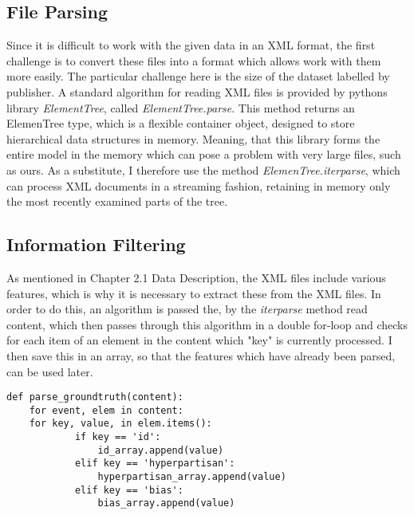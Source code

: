 \documentclass[a4paper, 11pt,titlepage,oneside,openany]{book}
\begin{document}
\newpage
\subsection{File Parsing}
Since it is difficult to work with the given data in an XML format, the first challenge is to convert these files into a format which allows work with them more easily. The particular challenge here is the size of the dataset labelled by publisher. A standard algorithm for reading XML files is provided by pythons library \textit{ElementTree}, called \textit{ElementTree.parse}\cite{parse}. This method returns an ElemenTree type, which is a flexible container object, designed to store hierarchical data structures in memory. Meaning, that this library forms the entire model in the memory which can pose a problem with very large files, such as ours. As a substitute, I therefore use the method \textit{ElemenTree.iterparse}, which can process XML documents in a streaming fashion, retaining in memory only the most recently examined parts of the tree\cite{iterparse}. 


\subsection{Information Filtering}
As mentioned in Chapter 2.1 Data Description, the XML files include various features, which is why it is necessary to extract these from the XML files. In order to do this,  an algorithm  is passed the, by the \textit{iterparse} method read content, which then passes through this algorithm in a double for-loop and checks for each item of an element in the content which "key" is currently processed. I then save this in an array, so that the features which have already been parsed, can be used later. 

\begin{lstlisting}[caption=Parse Ground-Truth File]
def parse_groundtruth(content):
    for event, elem in content:
 	for key, value, in elem.items():
            if key == 'id':
                id_array.append(value)
            elif key == 'hyperpartisan':
                hyperpartisan_array.append(value)
            elif key == 'bias':
                bias_array.append(value)
\end{lstlisting}
\newpage 
\end{document}
